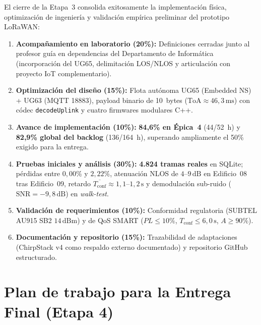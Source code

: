 \documentclass[12pt,oneside,openany,spanish,oldfontcommands]{memoir}
\begin{document}
El cierre de la Etapa~3 consolida exitosamente la implementación física, optimización de ingeniería y validación empírica preliminar del prototipo LoRaWAN:
\begin{enumerate}
    \item \textbf{Acompañamiento en laboratorio (20\%):} Definiciones cerradas junto al profesor guía en dependencias del Departamento de Informática (incorporación del UG65, delimitación LOS/NLOS y articulación con proyecto IoT complementario).
    \item \textbf{Optimización del diseño (15\%):} Flota autónoma UG65 (Embedded NS) + UG63 (MQTT 18883), payload binario de 10~bytes ($\text{ToA} \approx 46,3\,\text{ms}$) con códec \texttt{decodeUplink} y cuatro firmwares modulares C++.
    \item \textbf{Avance de implementación (10\%):} \textbf{84,6\% en Épica~4} (44/52~h) y \textbf{82,9\% global del backlog} (136/164~h), superando ampliamente el 50\% exigido para la entrega.
    \item \textbf{Pruebas iniciales y análisis (30\%):} \textbf{4.824 tramas reales} en SQLite; pérdidas entre $0,00\%$ y $2,22\%$, atenuación NLOS de $4\text{--}9\,\text{dB}$ en Edificio~08 tras Edificio~09, retardo $\overline{T_{\mathrm{conf}}} \approx 1,1\text{--}1,2\,\text{s}$ y demodulación sub-ruido ($\text{SNR} = -9,8\,\text{dB}$) en \textit{walk-test}.
    \item \textbf{Validación de requerimientos (10\%):} Conformidad regulatoria (SUBTEL AU915 SB2 $14\,\text{dBm}$) y de QoS SMART ($PL \leq 10\%$, $T_{\mathrm{conf}} \leq 6,0\,\text{s}$, $A \geq 90\%$).
    \item \textbf{Documentación y repositorio (15\%):} Trazabilidad de adaptaciones (ChirpStack v4 como respaldo externo documentado) y repositorio GitHub estructurado.
\end{enumerate}

\section{Plan de trabajo para la Entrega Final (Etapa 4)}
\end{document}
